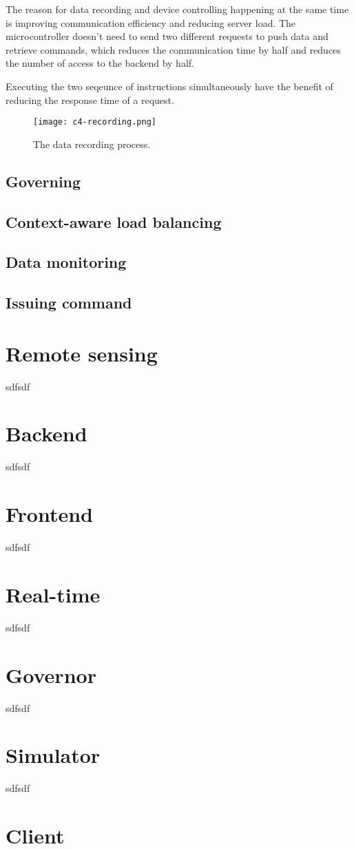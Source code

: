 \documentclass[../thesis.tex]{subfiles}
\begin{document}
The reason for data recording and device controlling happening at the same time is improving communication efficiency and reducing server load. The microcontroller doesn't need to send two different requests to push data and retrieve commands, which reduces the communication time by half and reduces the number of access to the backend by half. 

Executing the two seqeunce of instructions simultaneously have the benefit of reducing the response time of a request. 

\begin{figure}[!ht]
	\centering
	\texttt{[image: c4-recording.png]}
	\caption{The data recording process.}
	\label{fig:record}
\end{figure}

\subsection{Governing}


\subsection{Context-aware load balancing}

\subsection{Data monitoring}

\subsection{Issuing command}




\newpage
\section{Remote sensing}
\label{sec:remoteSensing}
sdfsdf

\section{Backend}
\label{sec:backend}
sdfsdf
\section{Frontend}
\label{sec:frontend}
sdfsdf
\section{Real-time}
\label{sec:realtime}
sdfsdf
\section{Governor}
\label{sec:governor}
sdfsdf
\section{Simulator}
\label{sec:simulator}
sdfsdf
\section{Client}
\label{sec:webClient}
\end{document}
